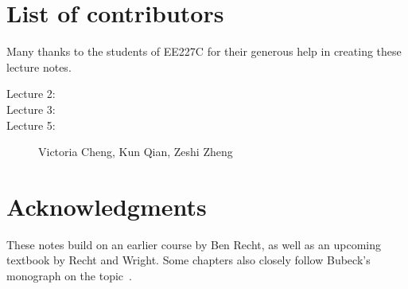 \section{List of contributors}

Many thanks to the students of EE227C for their generous help in creating these
lecture notes.

\begin{description}
\item[Lecture 2:]
\item[Lecture 3:]
\item[Lecture 5:] Victoria Cheng, Kun Qian, Zeshi Zheng
\end{description}

\section{Acknowledgments}

These notes build on an earlier course by Ben Recht, as well as an upcoming
textbook by Recht and Wright. Some chapters also closely follow Bubeck's
monograph on the topic~\cite{Bubeck}.
